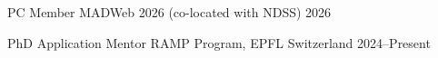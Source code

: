 
\begin{cvhonors}

  \cvhonor
    {PC Member}
    {MADWeb 2026 (co-located with NDSS)}
    {}
    {2026}

  \cvhonor
    {PhD Application Mentor}
    {RAMP Program, EPFL}
    {Switzerland}
    {2024--Present}



\end{cvhonors}
